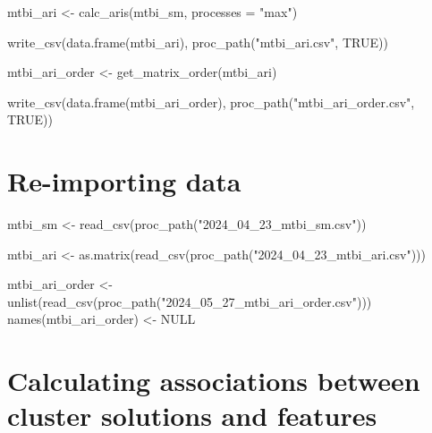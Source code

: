 \documentclass[
  letterpaper,
  DIV=11,
  numbers=noendperiod]{scrreprt}
\newenvironment{Shaded}{\begin{snugshade}}{\end{snugshade}}
\newcommand{\AttributeTok}[1]{\textcolor[rgb]{0.40,0.45,0.13}{#1}}
\newcommand{\ConstantTok}[1]{\textcolor[rgb]{0.56,0.35,0.01}{#1}}
\newcommand{\FunctionTok}[1]{\textcolor[rgb]{0.28,0.35,0.67}{#1}}
\newcommand{\NormalTok}[1]{\textcolor[rgb]{0.00,0.23,0.31}{#1}}
\newcommand{\OtherTok}[1]{\textcolor[rgb]{0.00,0.23,0.31}{#1}}
\newcommand{\StringTok}[1]{\textcolor[rgb]{0.13,0.47,0.30}{#1}}
\begin{document}
\begin{Shaded}
\begin{Highlighting}[]
\NormalTok{mtbi\_ari }\OtherTok{\textless{}{-}} \FunctionTok{calc\_aris}\NormalTok{(mtbi\_sm, }\AttributeTok{processes =} \StringTok{"max"}\NormalTok{)}

\FunctionTok{write\_csv}\NormalTok{(}\FunctionTok{data.frame}\NormalTok{(mtbi\_ari), }\FunctionTok{proc\_path}\NormalTok{(}\StringTok{"mtbi\_ari.csv"}\NormalTok{, }\ConstantTok{TRUE}\NormalTok{))}

\NormalTok{mtbi\_ari\_order }\OtherTok{\textless{}{-}} \FunctionTok{get\_matrix\_order}\NormalTok{(mtbi\_ari)}

\FunctionTok{write\_csv}\NormalTok{(}\FunctionTok{data.frame}\NormalTok{(mtbi\_ari\_order), }\FunctionTok{proc\_path}\NormalTok{(}\StringTok{"mtbi\_ari\_order.csv"}\NormalTok{, }\ConstantTok{TRUE}\NormalTok{))}
\end{Highlighting}
\end{Shaded}

\section{Re-importing data}\label{re-importing-data}

\begin{Shaded}
\begin{Highlighting}[]
\NormalTok{mtbi\_sm }\OtherTok{\textless{}{-}} \FunctionTok{read\_csv}\NormalTok{(}\FunctionTok{proc\_path}\NormalTok{(}\StringTok{"2024\_04\_23\_mtbi\_sm.csv"}\NormalTok{))}

\NormalTok{mtbi\_ari }\OtherTok{\textless{}{-}} \FunctionTok{as.matrix}\NormalTok{(}\FunctionTok{read\_csv}\NormalTok{(}\FunctionTok{proc\_path}\NormalTok{(}\StringTok{"2024\_04\_23\_mtbi\_ari.csv"}\NormalTok{)))}

\NormalTok{mtbi\_ari\_order }\OtherTok{\textless{}{-}} \FunctionTok{unlist}\NormalTok{(}\FunctionTok{read\_csv}\NormalTok{(}\FunctionTok{proc\_path}\NormalTok{(}\StringTok{"2024\_05\_27\_mtbi\_ari\_order.csv"}\NormalTok{)))}
\FunctionTok{names}\NormalTok{(mtbi\_ari\_order) }\OtherTok{\textless{}{-}} \ConstantTok{NULL}
\end{Highlighting}
\end{Shaded}

\section{Calculating associations between cluster solutions and
features}\label{calculating-associations-between-cluster-solutions-and-features}
\end{document}
